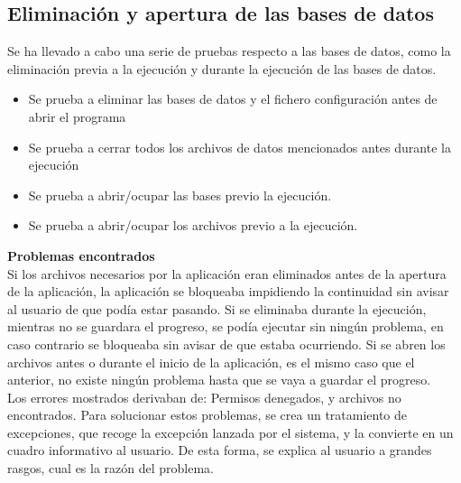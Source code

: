 \subsection{Eliminación y apertura de las bases de datos}
Se ha llevado a cabo una serie de pruebas respecto a las bases de datos, como la eliminación previa a la ejecución y durante la ejecución de las bases de datos.
\begin{itemize}
\item Se prueba a eliminar las bases de datos y el fichero configuración antes de abrir el programa
\item Se prueba a cerrar todos los archivos de datos mencionados antes durante la ejecución
\item Se prueba a abrir/ocupar las bases previo la ejecución.
\item Se prueba a abrir/ocupar los archivos previo a la ejecución.
\end{itemize}
\textbf{Problemas encontrados}\\
Si los archivos necesarios por la aplicación eran eliminados antes de la apertura de la aplicación, la aplicación se bloqueaba impidiendo la continuidad sin avisar al usuario de que podía estar pasando. Si se eliminaba durante la ejecución, mientras no se guardara el progreso, se podía ejecutar sin ningún problema, en caso contrario se bloqueaba sin avisar de que estaba ocurriendo. Si se abren los archivos antes o durante el inicio de la aplicación, es el mismo caso que el anterior, no existe ningún problema hasta que se vaya a guardar el progreso.\\
Los errores mostrados derivaban de: Permisos denegados, y archivos no encontrados. Para solucionar estos problemas, se crea un tratamiento de excepciones, que recoge la excepción lanzada por el sistema, y la convierte en un cuadro informativo al usuario. De esta forma, se explica al usuario a grandes rasgos, cual es la razón del problema.